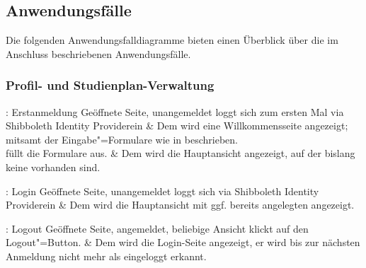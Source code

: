 \subsection{Anwendungsfälle}

Die folgenden Anwendungsfalldiagramme bieten einen Überblick über die im Anschluss beschriebenen Anwendungsfälle.

\begin{center}
	\resizebox{\textwidth}{!} {
		
	}
\end{center}

\begin{center}	
	\resizebox{\textwidth}{!} {
		
	}
\end{center}


\subsubsection{Profil- und Studienplan-Verwaltung}

\begin{usecase}{: Erstanmeldung}
	{Geöffnete Seite, unangemeldet}
	 loggt sich zum ersten Mal via \gls{Shibboleth Identity Provider}\opt ein
	& Dem  wird eine Willkommensseite angezeigt; mitsamt der Eingabe"=Formulare wie in  beschrieben.\\ 
	\hline
	 füllt die Formulare aus.
	& Dem  wird die Hauptansicht angezeigt, auf der bislang keine  vorhanden sind. 	
\end{usecase}

\begin{usecase}{: Login}
	{Geöffnete Seite, unangemeldet}
	 loggt sich via \gls{Shibboleth Identity Provider}\opt ein
	& Dem  wird die Hauptansicht mit ggf. bereits angelegten  angezeigt.
\end{usecase}

\begin{usecase}{: Logout}
	{Geöffnete Seite, angemeldet, beliebige Ansicht}
	 klickt auf den Logout"=Button.
	& Dem  wird die Login-Seite angezeigt, er wird bis zur nächsten Anmeldung nicht mehr als eingeloggt erkannt.
\end{usecase}

